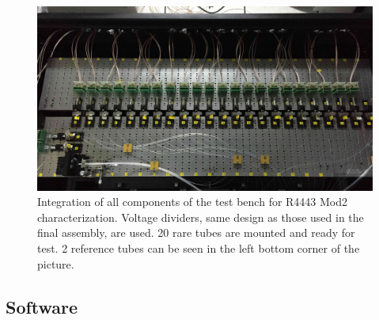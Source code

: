 \documentclass[5p, times]{elsarticle}
\begin{document}

\begin{figure}[t]
 \centering
 \includegraphics[width=120mm]{integration3}
\caption{Integration of all components of the test bench for R4443 Mod2 characterization.
Voltage dividers, same design as those used in the final assembly, are used. 
20 rare tubes are mounted and ready for test.
2 reference tubes can be seen in the left bottom corner of the picture. 
}
\label{fig:integrated_testbench}
\end{figure}

\subsection{Software}
\label{sec:software}
\end{document}
